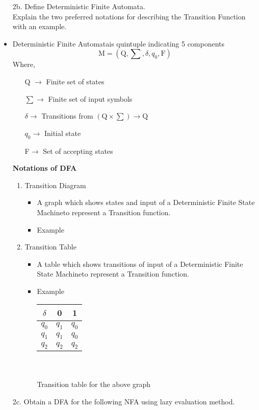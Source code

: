\documentclass{article}
\def \answer{\item [$\rightarrow$]}
\def \DFA{Deterministic Finite Automata}
\def \DFSM{Deterministic Finite State Machine}
\begin{document}
\begin{itemize}
		\item [2b.] Define Deterministic Finite Automata. \\
			Explain the two preferred notations for describing the Transition Function with an example.
		\answer \DFA is quintuple indicating 5 components $$\text{M}=(\text{Q},\sum,\delta,q_0,\text{F})$$
			Where,
			\begin{enumerate}
				\item [Q $\rightarrow$] Finite set of states
				\item [$\sum\rightarrow$] Finite set of input symbols
				\item [$\delta\rightarrow$] Transitions from $(\text{Q}\times\sum)\to \text{Q}$
				\item [$q_0\rightarrow$] Initial state
				\item [F$\rightarrow$] Set of accepting states
			\end{enumerate}
		\textbf{Notations of DFA}
		\begin{enumerate}
			\item Transition Diagram
				\begin{itemize}
					\item A graph which shows states and input of a \DFSM to represent a Transition function.
					\item Example 
				\end{itemize}
			\item Transition Table
				\begin{itemize}
					\item A table which shows transitions of input of a \DFSM to represent a Transition function.
					\item Example
						\begin{table}[H]
							\centering
							\begin{tabular}{c|c|c}
								$\delta$ & 0 & 1 \\ \hline
								$q_0$ & $q_1$ & $q_0$ \\
								$q_1$ & $q_1$ & $q_0$ \\
								$q_2$ & $q_2$ & $q_2$
							\end{tabular} \\ ~ \\
							Transition table for the above graph
						\end{table}
				\end{itemize}
		\end{enumerate}
	\item [2c.] Obtain a DFA for the following NFA using lazy evaluation method. 

\end{itemize}
\end{document}
